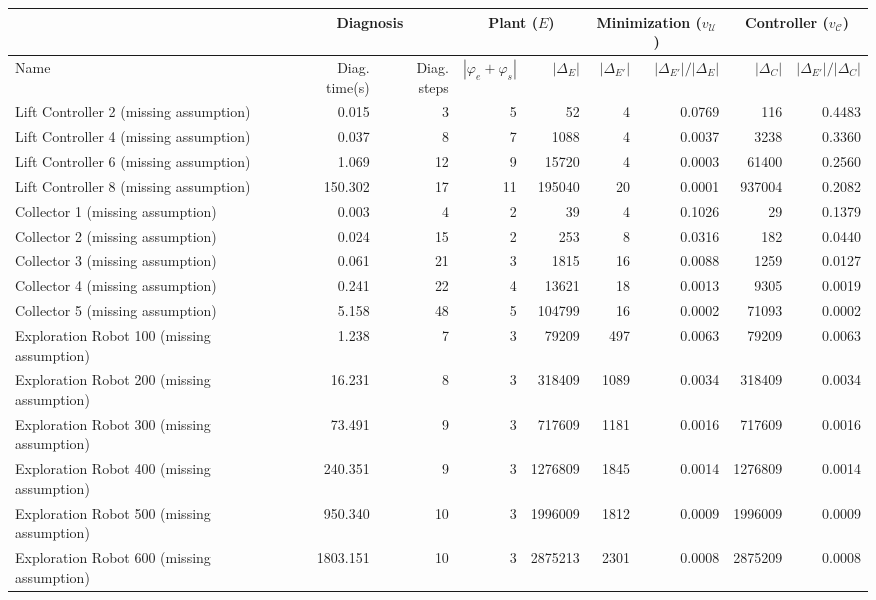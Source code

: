 \begin{tabular}{|l|rr|rr|rr|rr|}
  \hline & \multicolumn{2}{c|}{Diagnosis}&\multicolumn{2}{c|}{Plant ($E$)} & \multicolumn{2}{c|}{Minimization ($v_{\mathcal{U}}$)} & \multicolumn{2}{c|}{Controller ($v_{\mathcal{C}}$)}\\ \hline
Name & Diag. time(s) & Diag. steps & $|\varphi_e + \varphi_s|$ & $|\Delta_E|$ & $|\Delta_{E'}|$ & $|\Delta_{E'}|/|\Delta_{E}|$ & $|\Delta_{C}|$ & $|\Delta_{E'}|/|\Delta_{C}|$ \\ 
  \hline
Lift Controller 2 (missing assumption) & 0.015 & 3 & 5 & 52 & 4 & 0.0769 & 116 & 0.4483 \\ 
  Lift Controller 4 (missing assumption) & 0.037 & 8 & 7 & 1088 & 4 & 0.0037 & 3238 & 0.3360 \\ 
  Lift Controller 6 (missing assumption) & 1.069 & 12 & 9 & 15720 & 4 & 0.0003 & 61400 & 0.2560 \\ 
  Lift Controller 8 (missing assumption) & 150.302 & 17 & 11 & 195040 & 20 & 0.0001 & 937004 & 0.2082 \\ 
  Collector 1 (missing assumption) & 0.003 & 4 & 2 & 39 & 4 & 0.1026 & 29 & 0.1379 \\ 
  Collector 2 (missing assumption) & 0.024 & 15 & 2 & 253 & 8 & 0.0316 & 182 & 0.0440 \\ 
  Collector 3 (missing assumption) & 0.061 & 21 & 3 & 1815 & 16 & 0.0088 & 1259 & 0.0127 \\ 
  Collector 4 (missing assumption) & 0.241 & 22 & 4 & 13621 & 18 & 0.0013 & 9305 & 0.0019 \\ 
  Collector 5 (missing assumption) & 5.158 & 48 & 5 & 104799 & 16 & 0.0002 & 71093 & 0.0002 \\ 
  Exploration Robot 100 (missing assumption) & 1.238 & 7 & 3 & 79209 & 497 & 0.0063 & 79209 & 0.0063 \\ 
  Exploration Robot 200 (missing assumption) & 16.231 & 8 & 3 & 318409 & 1089 & 0.0034 & 318409 & 0.0034 \\ 
  Exploration Robot 300 (missing assumption) & 73.491 & 9 & 3 & 717609 & 1181 & 0.0016 & 717609 & 0.0016 \\ 
  Exploration Robot 400 (missing assumption) & 240.351 & 9 & 3 & 1276809 & 1845 & 0.0014 & 1276809 & 0.0014 \\ 
  Exploration Robot 500 (missing assumption) & 950.340 & 10 & 3 & 1996009 & 1812 & 0.0009 & 1996009 & 0.0009 \\ 
  Exploration Robot 600 (missing assumption) & 1803.151 & 10 & 3 & 2875213 & 2301 & 0.0008 & 2875209 & 0.0008 \\ 

\end{tabular}
